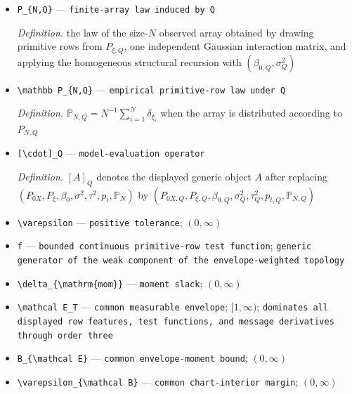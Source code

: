 \documentclass{article}
\begin{document}
\begin{itemize}
  \item \texttt{P\_\allowbreak{}\{N,\allowbreak{}Q\}\allowbreak{}} --- \texttt{finite-\allowbreak{}array law induced by Q}
  \par\smallskip\noindent\emph{Definition.} the law of the size-\(N\) observed array obtained by drawing primitive rows from \(P_{\xi,Q}\), one independent Gaussian interaction matrix, and applying the homogeneous structural recursion with \((\beta_{0,Q},\sigma_Q^2)\)
  \item \texttt{\textbackslash{}\allowbreak{}mathbb P\_\allowbreak{}\{N,\allowbreak{}Q\}\allowbreak{}} --- \texttt{empirical primitive-\allowbreak{}row law under Q}
  \par\smallskip\noindent\emph{Definition.} \(\mathbb P_{N,Q}=N^{-1}\sum_{i=1}^N\delta_{\xi_i}\) when the array is distributed according to \(P_{N,Q}\)
  \item \texttt{[\textbackslash{}\allowbreak{}cdot]\_\allowbreak{}Q} --- \texttt{model-\allowbreak{}evaluation operator}
  \par\smallskip\noindent\emph{Definition.} \([A]_Q\) denotes the displayed generic object \(A\) after replacing \((P_{0X},P_\xi,\beta_0,\sigma^2,\tau^2,p_t,\mathbb P_N)\) by \((P_{0X,Q},P_{\xi,Q},\beta_{0,Q},\sigma_Q^2,\tau_Q^2,p_{t,Q},\mathbb P_{N,Q})\)
  \item \texttt{\textbackslash{}\allowbreak{}varepsilon} --- \texttt{positive tolerance}; \((0,\infty)\)
  \item \texttt{f} --- \texttt{bounded continuous primitive-\allowbreak{}row test function}; \texttt{generic generator of the weak component of the envelope-\allowbreak{}weighted topology}
  \item \texttt{\textbackslash{}\allowbreak{}delta\_\allowbreak{}\{\textbackslash{}\allowbreak{}mathrm\{mom\}\allowbreak{}\}\allowbreak{}} --- \texttt{moment slack}; \((0,\infty)\)
  \item \texttt{\textbackslash{}\allowbreak{}mathcal E\_\allowbreak{}T} --- \texttt{common measurable envelope}; \([1,\infty)\); \texttt{dominates all displayed row features,\allowbreak{} test functions,\allowbreak{} and message derivatives through order three}
  \item \texttt{B\_\allowbreak{}\{\textbackslash{}\allowbreak{}mathcal E\}\allowbreak{}} --- \texttt{common envelope-\allowbreak{}moment bound}; \((0,\infty)\)
  \item \texttt{\textbackslash{}\allowbreak{}varepsilon\_\allowbreak{}\{\textbackslash{}\allowbreak{}mathcal B\}\allowbreak{}} --- \texttt{common chart-\allowbreak{}interior margin}; \((0,\infty)\)

\end{itemize}
\end{document}
